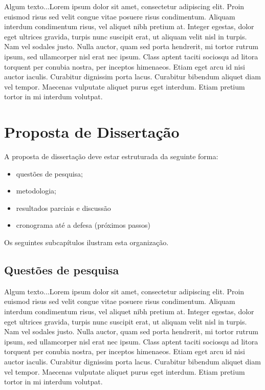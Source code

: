 \documentclass[quali]{mpit}
\begin{document}
Algum texto...Lorem ipsum dolor sit amet, consectetur adipiscing elit. Proin euismod risus sed velit congue vitae posuere risus condimentum. Aliquam interdum condimentum risus, vel aliquet nibh pretium at. Integer egestas, dolor eget ultrices gravida, turpis nunc suscipit erat, ut aliquam velit nisl in turpis. Nam vel sodales justo. Nulla auctor, quam sed porta hendrerit, mi tortor rutrum ipsum, sed ullamcorper nisl erat nec ipsum. Class aptent taciti sociosqu ad litora torquent per conubia nostra, per inceptos himenaeos. Etiam eget arcu id nisi auctor iaculis. Curabitur dignissim porta lacus. Curabitur bibendum aliquet diam vel tempor. Maecenas vulputate aliquet purus eget interdum. Etiam pretium tortor in mi interdum volutpat.

\chapter{Proposta de Dissertação}

A proposta de dissertação deve estar estruturada da seguinte forma:
\begin{itemize}
\item questões de pesquisa;
\item metodologia;
\item resultados parciais e discussão
\item cronograma até a defesa (próximos passos)
\end{itemize}

Os seguintes subcapítulos ilustram esta organização.

\section{Questões de pesquisa}

Algum texto...Lorem ipsum dolor sit amet, consectetur adipiscing elit. Proin euismod risus sed velit congue vitae posuere risus condimentum. Aliquam interdum condimentum risus, vel aliquet nibh pretium at. Integer egestas, dolor eget ultrices gravida, turpis nunc suscipit erat, ut aliquam velit nisl in turpis. Nam vel sodales justo. Nulla auctor, quam sed porta hendrerit, mi tortor rutrum ipsum, sed ullamcorper nisl erat nec ipsum. Class aptent taciti sociosqu ad litora torquent per conubia nostra, per inceptos himenaeos. Etiam eget arcu id nisi auctor iaculis. Curabitur dignissim porta lacus. Curabitur bibendum aliquet diam vel tempor. Maecenas vulputate aliquet purus eget interdum. Etiam pretium tortor in mi interdum volutpat.
\end{document}
